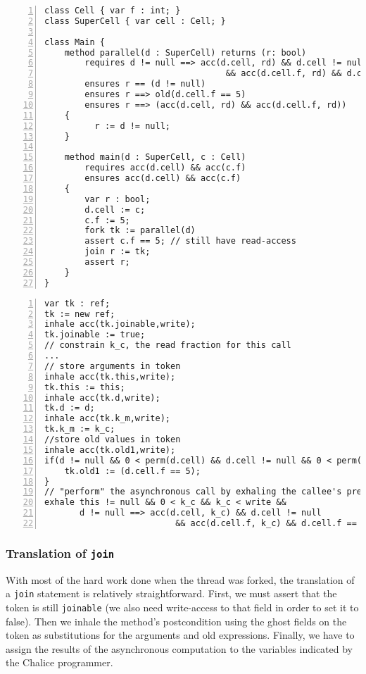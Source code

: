 \begin{lstlisting}[float,caption={Example of Chalice program featuring fork and join of method with a possibly undefined \lstinline!old! expression.},label=lst:fjexample,language=chalice,numbers=left]
class Cell { var f : int; }
class SuperCell { var cell : Cell; }

class Main {
    method parallel(d : SuperCell) returns (r: bool)
        requires d != null ==> acc(d.cell, rd) && d.cell != null 
				                    && acc(d.cell.f, rd) && d.cell.f == 5
        ensures r == (d != null)
        ensures r ==> old(d.cell.f == 5)
        ensures r ==> (acc(d.cell, rd) && acc(d.cell.f, rd))
    {
          r := d != null;
    }

    method main(d : SuperCell, c : Cell)
        requires acc(d.cell) && acc(c.f)
        ensures acc(d.cell) && acc(c.f)
    {
        var r : bool;
        d.cell := c;
        c.f := 5;
        fork tk := parallel(d)
        assert c.f == 5; // still have read-access
        join r := tk;
        assert r;
    }
}
\end{lstlisting}

\begin{lstlisting}[float,caption={Translation of the \lstinline!fork! statement on line 22 in listing \ref{lst:fjexample}.},label=lst:fjexamplefork,language=sil,numbers=left]
var tk : ref;
tk := new ref;
inhale acc(tk.joinable,write);
tk.joinable := true;
// constrain k_c, the read fraction for this call 
...
// store arguments in token
inhale acc(tk.this,write);
tk.this := this;
inhale acc(tk.d,write);
tk.d := d;
inhale acc(tk.k_m,write);
tk.k_m := k_c;
//store old values in token
inhale acc(tk.old1,write);
if(d != null && 0 < perm(d.cell) && d.cell != null && 0 < perm(d.cell.f)){
	tk.old1 := (d.cell.f == 5);
}
// "perform" the asynchronous call by exhaling the callee's precondition
exhale this != null && 0 < k_c && k_c < write &&
       d != null ==> acc(d.cell, k_c) && d.cell != null 
				          && acc(d.cell.f, k_c) && d.cell.f == 5
\end{lstlisting}
 
\subsubsection{Translation of \lstinline!join!}\label{sct:fjjoin}
With most of the hard work done when the thread was forked, the translation of a \lstinline!join! statement is relatively straightforward.
First, we must assert that the token is still \lstinline!joinable! (we also need write-access to that field in order to set it to false). 
Then we inhale the method's postcondition using the ghost fields on the token as substitutions for the arguments and old expressions. 
Finally, we have to assign the results of the asynchronous computation to the variables indicated by the Chalice programmer.

